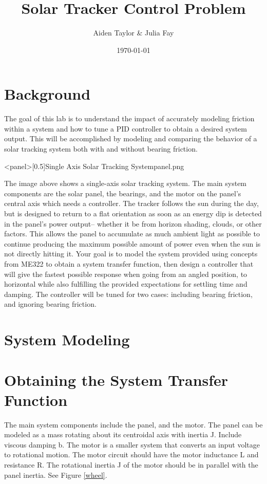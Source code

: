 \documentclass{homework}
\author{Aiden Taylor \& Julia Fay}
\date{\today}
\title{Solar Tracker Control Problem}
\begin{document}
  \maketitle
\section*{Background}

The goal of this lab is to understand the impact of accurately modeling friction within a system and how to tune a PID controller to obtain a desired system output. This will be accomplished by modeling and comparing the behavior of a solar tracking system both with and without bearing friction.

\img<panel>[0.5]{Single Axis Solar Tracking System}{panel.png}

The image above shows a single-axis solar tracking system. The main system components are the solar panel, the bearings, and the motor on the panel's central axis which needs a controller. The tracker follows the sun during the day, but is designed to return to a flat orientation as soon as an energy dip is detected in the panel's power output– whether it be from horizon shading, clouds, or other factors. This allows the panel to accumulate as much ambient light as possible to continue producing the maximum possible amount of power even when the sun is not directly hitting it. Your goal is to model the system provided using concepts from ME322 to obtain a system transfer function, then design a controller that will give the fastest possible response when going from an angled position, to horizontal while also fulfilling the provided expectations for settling time and damping. The controller will be tuned for two cases: including bearing friction, and ignoring bearing friction. 

\section*{System Modeling}
\section*{Obtaining the System Transfer Function}

\question The main system components include the panel, and the motor. The panel can be modeled as a mass rotating about its centroidal axis with inertia J. Include viscous damping b. The motor is a smaller system that converts an input voltage to rotational motion. The motor circuit should have the motor inductance L and resistance R. The rotational inertia J of the motor should be in parallel with the panel inertia. See Figure \ref{wheel}.
\end{document}
